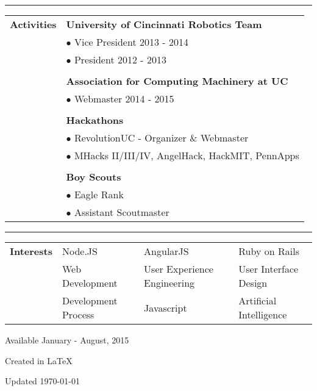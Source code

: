 \documentclass[11pt]{article} %
\begin{document}
\begin{small}
\begin{tabular}[t]{p{3cm}p{4cm}p{5cm}p{4cm}}
			\end{tabular}
			\vspace*{1\baselineskip}\hrule\vspace*{1\baselineskip}		
			\begin{tabular}[t]{p{3cm} p{16cm}}\large{\textbf{Activities}}
					& \textbf{University of Cincinnati Robotics Team}	\\
					& $\bullet$ Vice President 2013 - 2014					\\
					& $\bullet$ President 2012 - 2013						\\
					& \\
					& \textbf{Association for Computing Machinery at UC}\\
					& $\bullet$ Webmaster 2014 - 2015 \\
					& \\
					& \textbf{Hackathons} \\
					& $\bullet$ RevolutionUC - Organizer \& Webmaster \\
					& $\bullet$ MHacks II/III/IV, AngelHack, HackMIT, PennApps \\ 
					& \\
					& \textbf{Boy Scouts} 				\\
					& $\bullet$ Eagle Rank				\\
					& $\bullet$ Assistant Scoutmaster	\\	
			\end{tabular}
			\vspace*{1\baselineskip}\hrule\vspace*{1\baselineskip}
			\begin{tabular}[t]{p{3cm} p{4cm}p{5cm}p{5cm}}\large{\textbf{Interests}}
				& Node.JS 			& AngularJS 					& Ruby on Rails \\
				& Web Development		& User Experience Engineering 	& User Interface Design 	\\
				& Development Process    & Javascript					& Artificial Intelligence \\
			\end{tabular}

			\vspace*{1\baselineskip}
			\centerline{Available January - August, 2015}
			\vspace*{1\baselineskip}
			\centerline{Created in \LaTeX}
			\centerline{\scriptsize{Updated \today}}
		\end{small}
\end{document}
